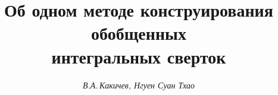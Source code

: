









\newcommand{\up}[1]{\overset{#1}{\ast}}


\newcommand{\sign}{\operatorname{sign}}


\newcommand{\sh}{\operatorname{sh}}


\newcommand{\ch}{\operatorname{ch}}


\newcommand{\tg}{\operatorname{tg}}


\newcommand{\arctg}{\operatorname{arctg}}


\newcommand{\re}{\operatorname{Re}}


\newcommand{\tts}[1]{}


\renewcommand{\baselinestretch}{1.1}















\setcounter{page}{31}












\author{\it В.А.\,Какичев, Нгуен Суан Тхао}




\title{ Об одном методе конструирования обобщенных\\


интегральных сверток}





